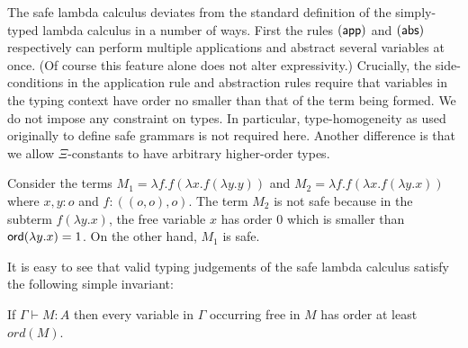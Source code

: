 The safe lambda calculus deviates from the standard definition of the simply-typed lambda calculus in a number of ways. First the rules $\mathbf{(\sf app)}$ and $\mathbf{(\sf abs)}$
respectively can perform multiple applications and abstract several
variables at once. (Of course this feature alone does not alter
expressivity.) Crucially, the side-conditions in the application rule
and abstraction rules require that variables in the typing context
have order no smaller than that of the term being formed.  We do not
impose any constraint on types. In particular, type-homogeneity as
used originally to define safe grammars \cite{KNU02} is not required
here. Another difference is that we allow $\Xi$-constants to have
arbitrary higher-order types.  %

\begin{example}
\label{ex:kierstead}
Consider the terms $M_1 = \lambda f . f (\lambda x . f (\lambda y . y
))$ and $M_2 = \lambda f . f (\lambda x . f (\lambda y .x ))$ where
$x,y:o$ and $f:((o,o),o)$. The term $M_2$ is not safe because in the
subterm $f (\lambda y . x)$, the free variable $x$ has order $0$ which
is smaller than ${\sf ord}(\lambda y . x) = 1$.  On the other hand, $M_1$
is safe.
\end{example}

It is easy to see that valid typing judgements of the safe lambda
calculus satisfy the following simple invariant:
\begin{lemma}
\label{lem:ordfreevar}
If $\Gamma \vdash M : A$ then every variable in $\Gamma$ occurring
free in $M$ has order at least $ord(M)$.
\end{lemma}


